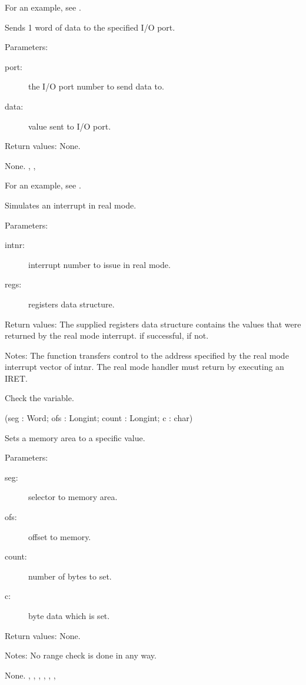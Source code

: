 For an example, see .

{Sends 1 word of data to the specified I/O port.

Parameters: 
\begin{description}
\item[port:\ ] the I/O port number to send data to.
\item[data:\ ] value sent to I/O port.
\end{description}

Return values: None.
}{ None. }
{, , }

For an example, see .

{Simulates an interrupt in real mode.

Parameters:
\begin{description}
\item[intnr:\ ] interrupt number to issue in real mode.
\item[regs:\ ] registers data structure.
\end{description}

Return values: The supplied registers data structure contains the values
that were returned by the real mode interrupt.  if successful,  if
not.

Notes: The function transfers control to the address specified by the real
mode interrupt vector of intnr. The real mode handler must return by
executing an IRET.
}
{ Check the  variable.}
{}

\html{}

{(seg : Word; ofs : Longint; count : Longint; c : char)}{
Sets a memory area to a specific value.

Parameters:
\begin{description}
\item[seg:\ ] selector to memory area.
\item[ofs:\ ] offset to memory.
\item[count:\ ] number of bytes to set.
\item[c:\ ] byte data which is set.
\end{description}

Return values: None.

Notes: No range check is done in any way.
}{ None. }
{,
,
,
,
,
,
 }

